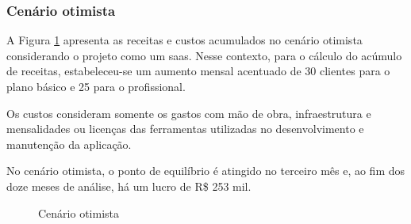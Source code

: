 \subsubsection{Cenário otimista}

A Figura \ref{fig:cenario-otimista} apresenta as receitas e custos acumulados no cenário otimista considerando o projeto como um \gls{saas}. Nesse contexto, para o cálculo do acúmulo de receitas, estabeleceu-se um aumento mensal acentuado de 30 clientes para o plano básico e 25 para o profissional.

Os custos consideram somente os gastos com mão de obra, infraestrutura e mensalidades ou licenças das ferramentas utilizadas no desenvolvimento e manutenção da aplicação.

No cenário otimista, o ponto de equilíbrio é atingido no terceiro mês e, ao fim dos doze meses de análise, há um lucro de R\$ 253 mil.

\begin{figure}[h]
	\centering
	\caption{Cenário otimista}
	\label{fig:cenario-otimista}
\end{figure}